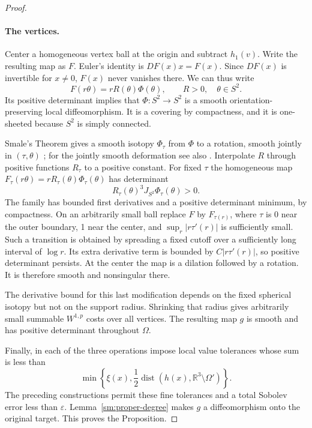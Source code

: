 \documentclass[11pt]{article}
\numberwithin{equation}{section}
\theoremstyle{definition}
\theoremstyle{remark}
\newcommand{\R}{\mathbb R}
\newcommand{\eps}{\varepsilon}
\DeclareMathOperator{\dist}{dist}
\begin{document}
\begin{proof}
\paragraph{The vertices.}
Center a homogeneous vertex ball at the origin and subtract
$h_1(v)$.  Write the resulting map as $F$.  Euler's identity is
$DF(x)x=F(x)$.  Since $DF(x)$ is invertible for $x\ne0$, $F(x)$
never vanishes there.  We can thus write
\begin{equation}
 \label{sm:vertex-form}
 F(r\theta)=rR(\theta)\Phi(\theta),\qquad
 R>0,\quad\theta\in S^2.
\end{equation}
Its positive determinant implies that $\Phi:S^2\to S^2$ is a
smooth orientation-preserving local diffeomorphism.  It is a
covering by compactness, and it is one-sheeted because $S^2$ is
simply connected.

Smale's Theorem gives a smooth isotopy $\Phi_\tau$ from $\Phi$
to a rotation, smooth jointly in $(\tau,\theta)$
\cite[Theorem~6]{Smale1959}; for the jointly smooth deformation see also
\cite[Theorem~1.5]{LiWatts2011}.  Interpolate $R$ through positive
functions $R_\tau$ to a positive constant.  For fixed $\tau$ the
homogeneous map
$F_\tau(r\theta)=rR_\tau(\theta)\Phi_\tau(\theta)$
has determinant
\[
 R_\tau(\theta)^3 J_{S^2}\Phi_\tau(\theta)>0.
\]
The family has bounded first derivatives and a positive
determinant minimum, by compactness.  On an arbitrarily small
ball replace $F$ by $F_{\tau(r)}$, where $\tau$ is 0 near the
outer boundary, 1 near the center, and
$\sup_r|r\tau'(r)|$ is sufficiently small.  Such a transition
is obtained by spreading a fixed cutoff over a sufficiently
long interval of $\log r$.  Its extra derivative term is
bounded by $C|r\tau'(r)|$, so positive determinant persists.
At the center the map is a dilation followed by a rotation.
It is therefore smooth and nonsingular there.

The derivative bound for this last modification depends on the
fixed spherical isotopy but not on the support radius.  Shrinking
that radius gives arbitrarily small summable $W^{1,p}$ costs
over all vertices.  The resulting map $g$ is smooth and has
positive determinant throughout $\Omega$.

Finally, in each of the three operations impose local value
tolerances whose sum is less than
\[
 \min\!\left\{\xi(x),\frac12
 \dist(h(x),\R^3\setminus\Omega')\right\}.
\]
The preceding constructions permit these fine tolerances and a
total Sobolev error less than $\eps$.  Lemma~\ref{sm:proper-degree}
makes $g$ a diffeomorphism onto the original target.  This proves
the Proposition.
\end{proof}
\end{document}
